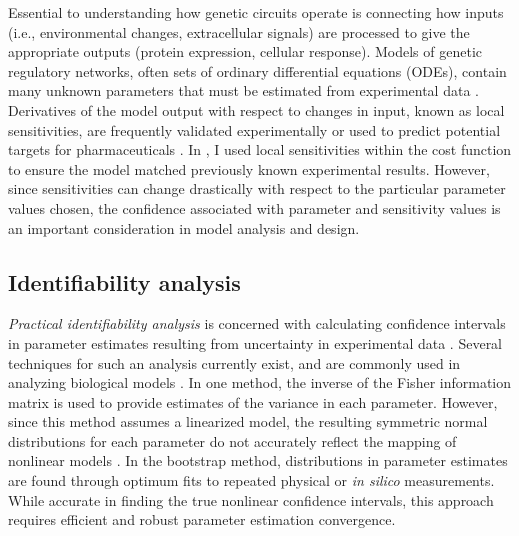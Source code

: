 Essential to understanding how genetic circuits operate is connecting how inputs (i.e., environmental changes, extracellular signals) are processed to give the appropriate outputs (protein expression, cellular response). 
Models of genetic regulatory networks, often sets of ordinary differential equations (ODEs), contain many unknown parameters that must be estimated from experimental data \cite{Gutenkunst2007}. 
Derivatives of the model output with respect to changes in input, known as local sensitivities, are frequently validated experimentally or used to predict potential targets for pharmaceuticals \cite{Kell2006}. 
In , I used local sensitivities within the cost function to ensure the model matched previously known experimental results.
However, since sensitivities can change drastically with respect to the particular parameter values chosen, the confidence associated with parameter and sensitivity values is an important consideration in model analysis and design.

\subsection{Identifiability analysis}

{\itshape Practical identifiability analysis} is concerned with calculating confidence intervals in parameter estimates resulting from uncertainty in experimental data \cite{Raue2009}. 
Several techniques for such an analysis currently exist, and are commonly used in analyzing biological models \cite{Nihtila1977, Jimenez-Hornero2009, Holmberg1982}. 
In one method, the inverse of the Fisher information matrix is used to provide estimates of the variance in each parameter. 
However, since this method assumes a linearized model, the resulting symmetric normal distributions for each parameter do not accurately reflect the mapping of nonlinear models \cite{Joshi2006}. 
In the bootstrap method, distributions in parameter estimates are found through optimum fits to repeated physical or {\itshape in silico} measurements. 
While accurate in finding the true nonlinear confidence intervals, this approach requires efficient and robust parameter estimation convergence.


